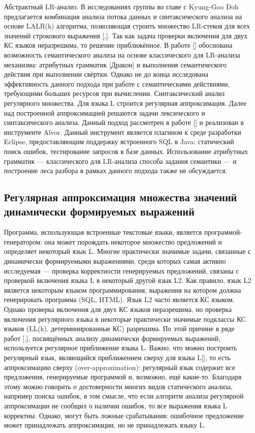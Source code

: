 Абстрактный LR-анализ. В исследованиях группы во главе  с Kyung-Goo Doh предлагается комбинация анализа потока данных и синтаксического анализа на основе LALR(k) алгоритма, позволяющая строить множество LR-стеков для всех значений строкового выражения [,]. Так как задача проверки включения для двух КС языков неразрешима, то решение приближённое. В работе [] обоснована возможность семантического анализа на основе классического для LR-анализа механизма: атрибутных грамматик [Дракон] и выполнения семантического действия при выполнении свёртки. Однако не до конца исследована эффективность данного подхода при работе с семантическими действиями, требующими больших ресурсов при вычислении.
Синтаксический анализ регулярного множества. Для языка L строится регулярная аппроксимация. Далее над построенной аппроксимацией решаются задачи лексического и синтаксического анализа. Данный подход рассмотрен в работе [] и реализован в инструменте Alvor. Данный инструмент является плагином к среде разработки Eclipse, предоставляющим поддержку встроенного SQL в Java: статический поиск ошибок, тестирование запросов в базе данных. Использование атрибутных грамматик — классического для LR-анализа способа задания семантики — и построение леса разбора в рамках данного подхода также не обсуждается.

\subsection{Регулярная аппроксимация множества значений динамически формируемых выражений}
Программа, использующая встроенные текстовые языки, является программой-генератором: она может порождать некоторое множество предложений и определяет некоторый язык L. 
Многие практически значимые задачи, связанные с динамически формируемыми выражениями, среди которых самая активно исследуемая — проверка корректности генерируемых предложений, связаны с 
проверкой включения языка L в некоторый другой язык L2. Как правило, язык L2 является некоторым языком программирования, выражения на котором должна генерировать программа (SQL, HTML). 
Язык L2 часто является КС языком. Однако проверка включения для двух КС языков неразрешима, но проверка включения регулярного языка в некоторые практически значимые подклассы КС языков (LL(k), 
детерминированные КС) разрешима. По этой причине в ряде работ [,], посвящённых анализу динамически формируемых выражений, используется регулярное приближение языка L. Важно, что можно построить 
регулярный язык, являющийся приближением сверху для языка L[], то есть аппроксимацию сверху (over-approximation): регулярный язык содержит все предложения, генерируемые программой и, возможно, ещё какие-то. 
Благодаря этому можно говорить о достоверности многих видов статического анализа, например поиска ошибок, в том смысле, что если алгоритм анализа регулярной аппроксимации не сообщил о наличии ошибок, 
то все выражения языка L корректны. Однако, могут быть ложные срабатывания: ошибочное предложение может принадлежать аппроксимации, но не принадлежать языку L.


